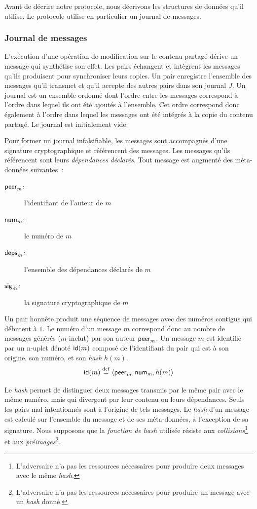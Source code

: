 Avant de décrire notre protocole, nous décrivons les structures de données qu'il utilise.
Le protocole utilise en particulier un journal de messages.

\subsubsection{Journal de messages}

L'exécution d'une opération de modification sur le contenu partagé dérive un message qui synthétise son effet.
Les pairs échangent et intègrent les messages qu'ils produisent pour synchroniser leurs copies.
Un pair enregistre l’ensemble des messages qu'il transmet et qu'il accepte des autres pairs dans son journal $J$.
Un journal est un ensemble ordonné dont l'ordre entre les messages correspond à l'ordre dans lequel ils ont été ajoutés à l'ensemble.
Cet ordre correspond donc également à l'ordre dans lequel les messages ont été intégrés à la copie du contenu partagé.
Le journal est initialement vide.

Pour former un journal infalsifiable, les messages sont accompagnés d'une signature cryptographique et référencent des messages.
Les messages qu'ils référencent sont leurs \emph{dépendances déclarés}.
Tout message est augmenté des méta-données suivantes~:
\begin{description}
    \item[$\trm{peer}_m$:] l'identifiant de l'auteur de $m$ 
    \item[$\trm{num}_m$:] le numéro de $m$
    \item[$\trm{deps}_m$:] l'ensemble des dépendances déclarés de $m$
    \item[$\trm{sig}_m$:] la signature cryptographique de $m$
\end{description}

Un pair honnête produit une séquence de messages avec des numéros contigus qui débutent à $1$.
Le numéro d'un message $m$ correspond donc au nombre de messages générés ($m$ inclut) par son auteur $\trm{peer}_m$.
Un message $m$ est identifié par un n-uplet dénoté $\trm{id}(m)$ composé de l'identifiant du pair qui est à son origine, son numéro, et son \emph{hash} $h(m)$.
%
\begin{equation*}
    \trm{id}(m) \defeq \tuple*{\trm{peer}_m, \trm{num}_m, h(m)}
\end{equation*}

Le \emph{hash} permet de distinguer deux messages transmis par le même pair avec le même numéro, mais qui divergent par leur contenu ou leurs dépendances.
Seuls les pairs mal-intentionnés sont à l'origine de tels messages.
Le \emph{hash} d'un message est calculé sur l'ensemble du message et de ses méta-données, à l'exception de sa signature.
Nous supposons que la \emph{fonction de hash} utilisée résiste aux \emph{collisions}\footnote{L'adversaire n'a pas les ressources nécessaires pour produire deux messages avec le même \emph{hash}.} et aux \emph{préimages}\footnote{L'adversaire n'a pas les ressources nécessaires pour produire un message avec un \emph{hash} donné.}.

